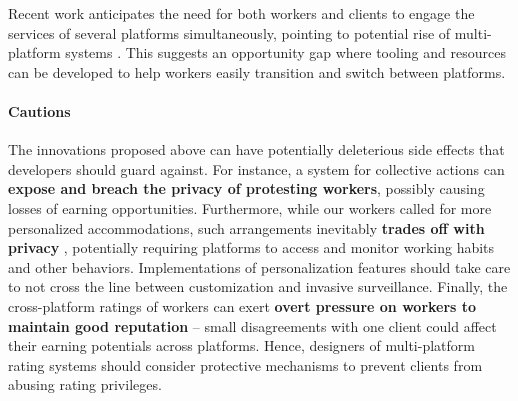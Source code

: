 \begin{itemize}
  Recent work anticipates the need for both workers and clients to engage the services of several platforms simultaneously, pointing to potential rise of multi-platform systems \cite{amiri2021separ}. This suggests an opportunity gap where tooling and resources can be developed to help workers easily transition and switch between platforms.
\end{itemize}

\paragraph{Cautions}
The innovations proposed above can have potentially deleterious side effects that developers should guard against. For instance, a system for collective actions can \textbf{expose and breach the privacy of protesting workers}, possibly causing losses of earning opportunities. Furthermore, while our workers called for more personalized accommodations, such arrangements inevitably \textbf{trades off with privacy }\cite{privacy, garcia2016personalization, lee2013designing}, potentially requiring platforms to access and monitor working habits and other behaviors. Implementations of personalization features should take care to not cross the line between customization and invasive surveillance. Finally, the cross-platform ratings of workers can exert \textbf{overt pressure on workers to maintain good reputation} -- small disagreements with one client could affect their earning potentials across platforms. Hence, designers of multi-platform rating systems should consider protective mechanisms to prevent clients from abusing rating privileges. 

